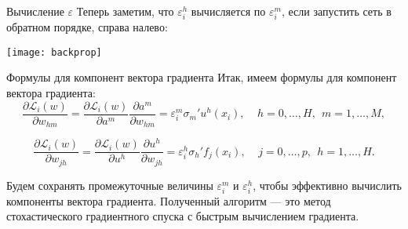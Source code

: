 \documentclass[11pt]{beamer}
\begin{document}
	\begin{frame}{Вычисление $\varepsilon$}
		Теперь заметим, что $\varepsilon_i^h$ вычисляется по $\varepsilon_i^m$, если запустить сеть в обратном порядке, справа налево:
		
		\begin{center}
			\centering
			\texttt{[image: backprop]}
		\end{center}
	\end{frame}

	\begin{frame}{Формулы для компонент вектора градиента}
		Итак, имеем формулы для компонент вектора градиента:
		\begin{equation*}
			\frac{\partial \mathcal{L}_i(w)}{\partial w_{hm}} = \frac{\partial \mathcal{L}_i(w)}{\partial a^m} \frac{\partial a^m}{\partial w_{hm}} =   \varepsilon^m_i \sigma_m' u^h(x_i), ~~~~~ h=0,\ldots,H, ~~ m=1,\ldots,M,
		\end{equation*}
		
		\begin{equation*}
			\frac{\partial \mathcal{L}_i(w)}{\partial w_{jh}} = \frac{\partial \mathcal{L}_i(w)}{\partial u^h} \frac{\partial u^h}{\partial w_{jh}} =   \varepsilon^h_i \sigma_h' f_j(x_i), ~~~~~ j=0,\ldots,p, ~~ h=1,\ldots,H.
		\end{equation*}
		
		Будем сохранять промежуточные величины $\varepsilon_i^m$ и $\varepsilon_i^h$, чтобы эффективно вычислить компоненты вектора градиента. Полученный алгоритм --- это метод стохастического градиентного спуска с быстрым вычислением градиента. \\
	\end{frame}
\end{document}
